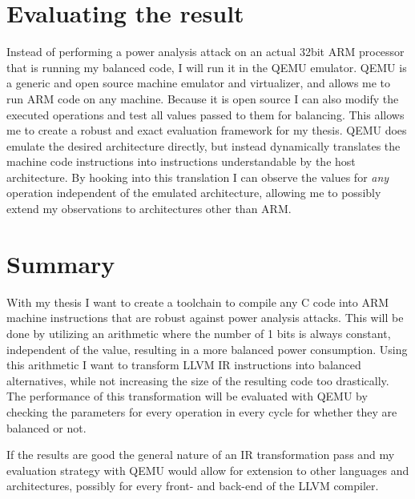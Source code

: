 \documentclass{article}
\newcommand{\qemu}{QEMU}
\begin{document}
\section{Evaluating the result}
\label{evaluation}
Instead of performing a power analysis attack on an actual 32bit ARM processor that is running my balanced code, I will run it in the \qemu{} emulator.
\qemu{} is a generic and open source machine emulator and virtualizer\cite{bellard2005qemu}, and allows me to run ARM code on any machine.
Because it is open source I can also modify the executed operations and test all values passed to them for balancing.
This allows me to create a robust and exact evaluation framework for my thesis.
\qemu{} does emulate the desired architecture directly, but instead dynamically translates the machine code instructions into instructions understandable by the host architecture.
By hooking into this translation I can observe the values for \emph{any} operation independent of the emulated architecture, allowing me to possibly extend my observations to architectures other than ARM.

\section{Summary}
With my thesis I want to create a toolchain to compile any C code into ARM machine instructions that are robust against power analysis attacks.
This will be done by utilizing an arithmetic where the number of 1 bits is always constant, independent of the value, resulting in a more balanced power consumption.
Using this arithmetic I want to transform LLVM IR instructions into balanced alternatives, while not increasing the size of the resulting code too drastically.
The performance of this transformation will be evaluated with \qemu{} by checking the parameters for every operation in every cycle for whether they are balanced or not.

If the results are good the general nature of an IR transformation pass and my evaluation strategy with \qemu{} would allow for extension to other languages and architectures, possibly for every front- and back-end of the LLVM compiler.



\end{document}
